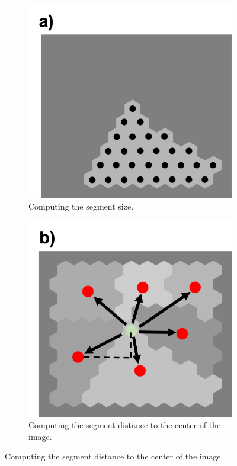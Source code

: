 \documentclass{article}
\begin{document}
\begin{figure}[!ht]
    \centering
    
    \begin{subfigure}[t]{0.35\textwidth}           
        \includegraphics[width = \linewidth]{plots/pred_segSize.png}
        \caption{Computing the segment size. }
        \label{fig:pred_segSize}    
    \end{subfigure}
    \hspace{0.05\textwidth}
    \begin{subfigure}[t]{0.35\textwidth}           
        \includegraphics[width = \linewidth]{plots/pred_segDist.png}
        \caption{Computing the segment distance to the center of the image. }
        \label{fig:pred_segDist}    
    \end{subfigure}
        

\end{figure}
\end{document}
